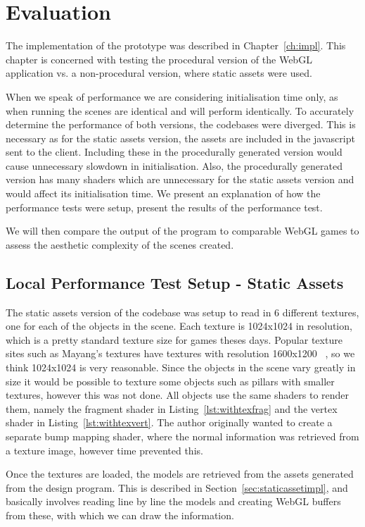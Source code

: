 \chapter{Evaluation}
\label{ch:evaluation}
The implementation of the prototype was described in Chapter~\ref{ch:impl}.
This chapter is concerned with testing the procedural version of the WebGL application vs. a non-procedural version, where static assets were used.

When we speak of performance we are considering initialisation time only, as when running the scenes are identical and will perform identically.
To accurately determine the performance of both versions, the codebases were diverged.
This is necessary as for the static assets version, the assets are included in the javascript sent to the client.
Including these in the procedurally generated version would cause unnecessary slowdown in initialisation.
Also, the procedurally generated version has many shaders which are unnecessary for the static assets version and would affect its initialisation time.
We present an explanation of how the performance tests were setup, present the results of the performance test.

We will then compare the output of the program to comparable WebGL games to assess the aesthetic complexity of the scenes created.

\section{Local Performance Test Setup - Static Assets}
The static assets version of the codebase was setup to read in 6 different textures, one for each of the objects in the scene.
Each texture is 1024x1024 in resolution, which is a pretty standard texture size for games theses days.
Popular texture sites such as Mayang's textures have textures with resolution 1600x1200 ~\cite{web:mayangtex}, so we think 1024x1024 is very reasonable.
Since the objects in the scene vary greatly in size it would be possible to texture some objects such as pillars with smaller textures, however this was not done.
All objects use the same shaders to render them, namely the fragment shader in Listing~\ref{lst:withtexfrag} and the vertex shader in Listing~\ref{lst:withtexvert}.
The author originally wanted to create a separate bump mapping shader, where the normal information was retrieved from a texture image, however time prevented this.

Once the textures are loaded, the models are retrieved from the assets generated from the design program.
This is described in Section~\ref{sec:staticassetimpl}, and basically involves reading line by line the models and creating WebGL buffers from these, with which we can draw the information.

